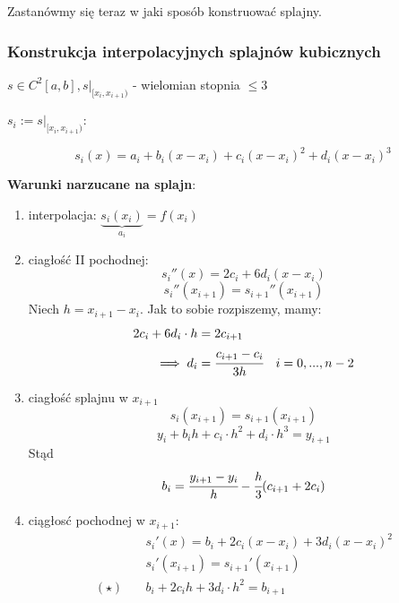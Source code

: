\documentclass[hidelinks,a4paper,fleqn,oneside]{book}
\begin{document}
Zastanówmy się teraz w jaki sposób konstruować splajny.
\subsubsection{Konstrukcja interpolacyjnych splajnów kubicznych}

$s \in C^2[a, b], s|_{[x_i, x_{i+1})}$ - wielomian stopnia $\leq 3$


$s_i := s|_{[x_i, x_{i+1})}$: 

\[
	s_i(x) = a_i + b_i(x-x_i) + c_i(x-x_i)^2 + d_i(x-x_i)^3
\]

\textbf{Warunki narzucane na splajn}:
\begin{enumerate}
	\item interpolacja: $\underbrace{s_i(x_i)}_{a_i} = f(x_i)$ 
	\item ciagłość II pochodnej:
		\[
			s_i''(x) = 2c_i + 6d_i(x-x_i)
		\]
		\[
			s_i''(x_{i+1}) = s_{i+1}''(x_{i+1})
		\]
		Niech $h = x_{i+1}-x_i$. Jak to sobie rozpiszemy, mamy:
		\begin{align*}
			2c_i + 6d_i \cdot h & = 2c_{i+1} \\
			\implies d_i &= \cfrac{c_{i+1}-c_i}{3h} \quad i=0, ..., n-2
		\end{align*}
		\item ciagłość splajnu w $x_{i+1}$
		\[
			s_i(x_{i+1}) = s_{i+1}(x_{i+1})
		\]
		\[
			y_i + b_ih + c_i \cdot h^2 + d_i\cdot h^3 = y_{i+1}
		\]
		Stąd
		\[
			b_i = \cfrac{y_{i+1}-y_i}{h} - \cfrac{h}{3}(c_{i+1} + 2c_i)
		\]
		\item ciągłosć pochodnej w $x_{i+1}$:
		\begin{align*}
			& s_i'(x) = b_i + 2c_i(x-x_i) + 3d_i(x-x_i)^2 \\
			& s_i'(x_{i+1}) = s_{i+1}'(x_{i+1}) \\ 
			(\star) \quad & b_i + 2c_ih + 3d_i\cdot h^2 = b_{i+1}
		\end{align*}
\end{enumerate}
\end{document}
